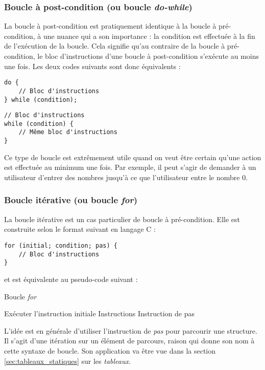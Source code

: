 \documentclass[../../../main.tex]{subfiles}
\begin{document}
\subsubsection{Boucle à post-condition (ou boucle \textit{do-while})}
\label{ssub:boucle_post_condition}
La boucle à post-condition est pratiquement identique à la boucle à pré-condition, à une nuance qui a son importance : la condition est effectuée à la fin de l'exécution de la boucle. Cela signifie qu'au contraire de la boucle à pré-condition, le bloc d'instructions d'une boucle à post-condition s'exécute au moins une fois. Les deux codes suivants sont donc équivalents :
 
\begin{minipage}{0.5\textwidth}
\begin{verbatim}
do {
	// Bloc d'instructions
} while (condition);

\end{verbatim}
\end{minipage}
\begin{minipage}{0.5\textwidth}
\begin{verbatim}
// Bloc d'instructions
while (condition) {
	// Même bloc d'instructions
}
\end{verbatim}
\end{minipage}
 
Ce type de boucle est extrêmement utile quand on veut être certain qu'une action est effectuée au minimum une fois. Par exemple, il peut s'agir de demander à un utilisateur d'entrer des nombres jusqu'à ce que l'utilisateur entre le nombre $0$.
 
\subsubsection{Boucle itérative (ou boucle \textit{for})}
\label{ssub:boucle_it_rative}
La boucle itérative est un cas particulier de boucle à pré-condition. Elle est construite selon le format suivant en langage C :
\begin{verbatim}
for (initial; condition; pas) {
	// Bloc d'instructions
}
\end{verbatim}
et est équivalente au pseudo-code suivant :
\begin{algorithm}
\caption{Boucle \textit{for}}
Exécuter l'instruction initiale\;
 {
	Instructions 
	Instruction de pas 
}
\end{algorithm} \newline
L'idée est en générale d'utiliser l'instruction de \textit{pas} pour parcourir une structure. Il s'agit d'une itération sur un élément de parcours, raison qui donne son nom à cette syntaxe de boucle. Son application va être vue dans la section \ref{sec:tableaux_statiques} sur les \textit{tableaux}.
 
\end{document}
